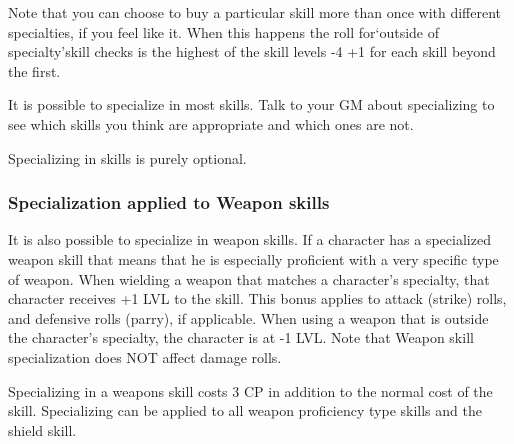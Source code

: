 \documentclass[twoside]{book}
\begin{document}
  
    {  
    Note that you can choose to buy a particular skill more than once with different specialties, if you feel like it. When this happens the roll for`outside of specialty'skill checks is the highest of the skill levels -4 +1 for each skill beyond the first.
    }
  
  

  

  
    {  
    It is possible to specialize in most skills. Talk to your GM about specializing to see which skills you think are appropriate and which ones are not.
    }
  
    {  
    Specializing in skills is purely optional.
    }
  
    

\subsubsection{Specialization applied to Weapon skills}
    
    {  
    It is also possible to specialize in weapon skills. If a character has a specialized weapon skill that means that he is especially proficient with a very specific type of weapon. When wielding a weapon that matches a character's specialty, that character receives +1 LVL to the skill. This bonus applies to attack (strike) rolls, and defensive rolls (parry), if applicable. When using a weapon that is outside the character's specialty, the character is at -1 LVL. Note that Weapon skill specialization does NOT affect damage rolls.
    }
  
    {  
    Specializing in a weapons skill costs 3 CP in addition to the normal cost of the skill. Specializing can be applied to all weapon proficiency type skills and the shield skill.
    }
  
\end{document}
